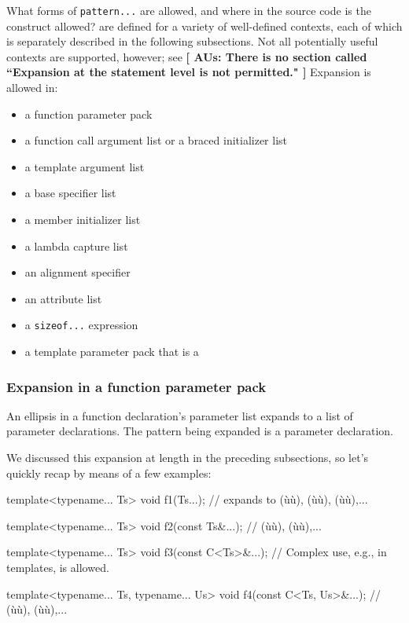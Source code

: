 What forms of \lstinline!pattern...! are allowed, and where in the source
code is the construct allowed?  are
defined for a variety of well-defined contexts, each of which is
separately described in the following subsections. Not all potentially
useful contexts are supported, however; see \textbf{[ AUs: There is no section called ``Expansion at the statement level is not permitted." ]}
Expansion is allowed in:
\begin{itemize}
\item{a function parameter pack}
\item{a function call argument list or a braced initializer list}
\item{a template argument list}
\item{a base specifier list}
\item{a member initializer list}
\item{a lambda capture list}
\item{an alignment specifier}
\item{an attribute list}
\item{a \lstinline!sizeof...! expression}
\item{a template parameter pack that is a }
\end{itemize}

\subsubsection[Expansion in a function parameter pack]{Expansion in a function parameter pack}\label{expansion-in-a-function-parameter-pack}

An ellipsis in a function declaration's parameter list expands to a list
of parameter declarations. The pattern being expanded is a parameter
declaration.

We discussed this expansion at length in the preceding subsections, so
let's quickly recap by means of a few examples:

\begin{emcppslisting}
template<typename... Ts>
void f1(Ts...);                // expands to (ù{}ù), (ù{}ù), (ù{}ù),...

template<typename... Ts>
void f2(const Ts&...);         // (ù{}ù), (ù{}ù),...

template<typename... Ts>
void f3(const C<Ts>&...);      // Complex use, e.g., in templates, is allowed.

template<typename... Ts, typename... Us>
void f4(const C<Ts, Us>&...);  // (ù{}ù), (ù{}ù),...
\end{emcppslisting}
    

